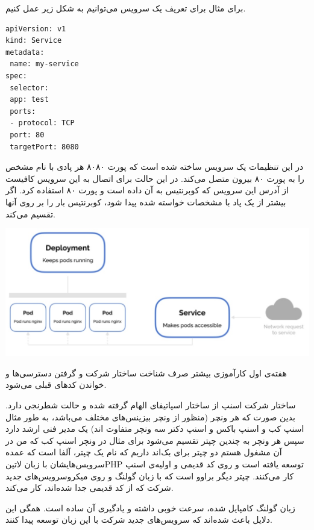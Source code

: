 \documentclass[a4]{report}
\begin{document}
برای مثال برای تعریف یک سرویس می‌توانیم به شکل زیر عمل کنیم.

\begin{latin}
\begin{verbatim}
apiVersion: v1
kind: Service
metadata:
 name: my-service
spec:
 selector:
 app: test
 ports:
 - protocol: TCP
 port: 80
 targetPort: 8080
\end{verbatim}
\end{latin}

در این تنظیمات یک سرویس ساخته شده است که پورت ۸۰۸۰ هر پادی با نام مشخص را به پورت ۸۰
بیرون متصل می‌کند. در این حالت برای اتصال به این سرویس کافیست از آدرس این سرویس که کوبرنتیس
به آن داده است و پورت ۸۰ استفاده کرد. اگر بیشتر از یک پاد با مشخصات خواسته شده پیدا شود، کوبرنتیس
بار را بر روی آنها تقسیم می‌کند.

\includegraphics[scale=0.5]{fig/service}


هفته‌ی اول کارآموزی بیشتر صرف شناخت ساختار شرکت و گرفتن دسترسی‌ها و خواندن کدهای قبلی می‌شود.

ساختار شرکت اسنپ از ساختار اسپاتیفای الهام گرفته شده و حالت شطرنجی دارد.
بدین صورت که هر ونچر (منظور از ونچر بیزینس‌های مختلف می‌باشد،
به طور مثال اسنپ کب و اسنپ باکس و اسنپ دکتر سه ونچر متفاوت اند)
یک مدیر فنی ارشد دارد سپس هر ونچر به چندین چپتر تقسیم می‌شود برای مثال در ونچر اسنپ کب که من در آن مشغول هستم
دو چپتر برای بک‌اند داریم که نام یک چپتر، آلفا است که عمده سرویس‌هایشان با زبان ‌لاتین{PHP} توسعه یافته است و روی کد قدیمی و اولیه‌ی اسنپ کار می‌کنند.
چپتر دیگر براوو است که با زبان گولنگ و روی میکروسرویس‌های جدید شرکت که از کد قدیمی جدا شده‌اند، کار می‌کند.

زبان گولنگ کامپایل شده، سرعت خوبی داشته و یادگیری آن ساده است. همگی این دلایل باعث شده‌اند که سرویس‌های جدید شرکت با این زبان توسعه پیدا کنند.
\end{document}
